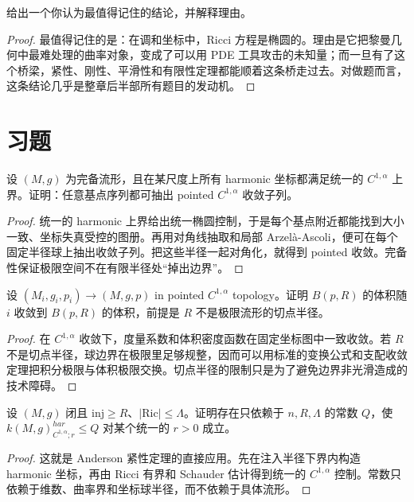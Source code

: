 \documentclass[11pt,a4paper,openany]{ctexbook}
\numberwithin{equation}{chapter}
\begin{document}
\begin{problem}
给出一个你认为最值得记住的结论，并解释理由。
\end{problem}
\begin{proof}
最值得记住的是：在调和坐标中，Ricci 方程是椭圆的。理由是它把黎曼几何中最难处理的曲率对象，变成了可以用 PDE 工具攻击的未知量；而一旦有了这个桥梁，紧性、刚性、平滑性和有限性定理都能顺着这条桥走过去。对做题而言，这条结论几乎是整章后半部所有题目的发动机。  
\end{proof}

\section{习题}

\begin{exercise}
设 \((M,g)\) 为完备流形，且在某尺度上所有 harmonic 坐标都满足统一的 \(C^{1,\alpha}\) 上界。证明：任意基点序列都可抽出 pointed \(C^{1,\alpha}\) 收敛子列。
\end{exercise}
\begin{proof}
统一的 harmonic 上界给出统一椭圆控制，于是每个基点附近都能找到大小一致、坐标失真受控的图册。再用对角线抽取和局部 Arzelà-Ascoli，便可在每个固定半径球上抽出收敛子列。把这些半径一起对角化，就得到 pointed 收敛。完备性保证极限空间不在有限半径处“掉出边界”。  
\end{proof}

\begin{exercise}
设 \((M_i,g_i,p_i)\to (M,g,p)\) in pointed \(C^{1,\alpha}\) topology。证明 \(B(p,R)\) 的体积随 \(i\) 收敛到 \(B(p,R)\) 的体积，前提是 \(R\) 不是极限流形的切点半径。
\end{exercise}
\begin{proof}
在 \(C^{1,\alpha}\) 收敛下，度量系数和体积密度函数在固定坐标图中一致收敛。若 \(R\) 不是切点半径，球边界在极限里足够规整，因而可以用标准的变换公式和支配收敛定理把积分极限与体积极限交换。切点半径的限制只是为了避免边界非光滑造成的技术障碍。  
\end{proof}

\begin{exercise}
设 \((M,g)\) 闭且 \(\mathrm{inj}\ge R\)、\(|\mathrm{Ric}|\le \Lambda\)。证明存在只依赖于 \(n,R,\Lambda\) 的常数 \(Q\)，使 \(k(M,g)^{har}_{C^{1,\alpha};r}\le Q\) 对某个统一的 \(r>0\) 成立。
\end{exercise}
\begin{proof}
这就是 Anderson 紧性定理的直接应用。先在注入半径下界内构造 harmonic 坐标，再由 Ricci 有界和 Schauder 估计得到统一的 \(C^{1,\alpha}\) 控制。常数只依赖于维数、曲率界和坐标球半径，而不依赖于具体流形。  
\end{proof}
\end{document}
